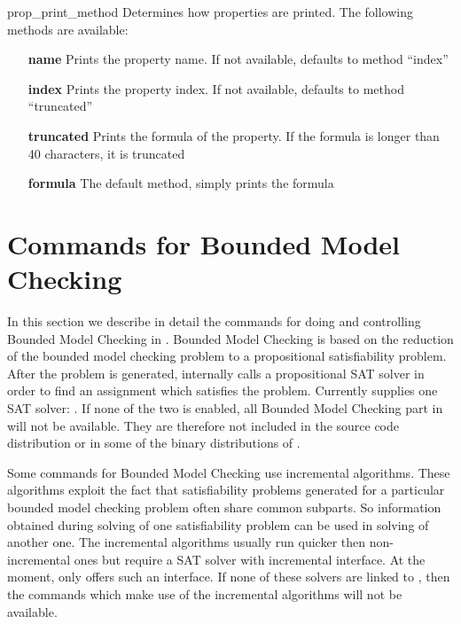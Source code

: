 \begin{nusmvVar} {prop\_print\_method}{}{}
Determines how properties are printed. The following methods are
available:
\begin{itemize}
  \item[\textbf{name}] Prints the property name. If not available, defaults to
        method ``index''

  \item[\textbf{index}] Prints the property index. If not available, defaults
       to method ``truncated''

  \item[\textbf{truncated}] Prints the formula of the property. If the formula
  is longer than 40 characters, it is truncated

  \item[\textbf{formula}] The default method, simply prints the formula
\end{itemize}
\end{nusmvVar}


\section{Commands for Bounded Model Checking}
\label{Commands for Bounded Model Checking}

In this section we describe in detail the commands for doing and
controlling Bounded Model Checking in \nusmv.  Bounded Model Checking
is based on the reduction of the bounded model checking problem to a
propositional satisfiability problem. After the problem is generated,
\nusmv internally calls a propositional SAT solver in order to find an
assignment which satisfies the problem.  Currently \nusmv supplies one
SAT solver: \minisat. If none of the two is enabled, all
Bounded Model Checking part in \nusmv will not be
available. \minisatnotice They are therefore not included in the
source code distribution or in some of the binary distributions
of \nusmv.

Some commands for Bounded Model Checking use incremental algorithms.
These algorithms exploit the fact that satisfiability
problems generated for a particular bounded model checking problem
often share common subparts. So information obtained during solving of
one satisfiability problem can be used in solving of
another one. The incremental algorithms usually run quicker then
non-incremental ones but require a SAT solver with incremental
interface. At the moment, only \minisat offers such an
interface.  If none of these solvers are linked to \nusmv, then the
commands which make use of the incremental algorithms will not be available.

